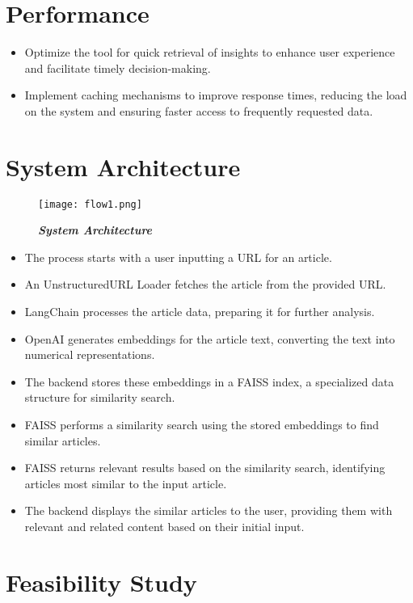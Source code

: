 \documentclass[12pt,a4paper]{report}
\begin{document}
{\section{Performance}
\begin{itemize}
	\item Optimize the tool for quick retrieval of insights to enhance user experience and facilitate timely decision-making.
	\item Implement caching mechanisms to improve response times, reducing the load on the system and ensuring faster access to frequently requested data.
	
\end{itemize}
\section{System Architecture}
\begin{figure}[ht]
	\begin{center}
		\texttt{[image: flow1.png]}
	\end{center}
	\caption{\textit{\textbf{System Architecture}}}
\end{figure}
\begin{itemize}
    \item The process starts with a user inputting a URL for an article.
    \item An UnstructuredURL Loader fetches the article from the provided URL.
    \item LangChain processes the article data, preparing it for further analysis.
    \item OpenAI generates embeddings for the article text, converting the text into numerical representations.
    \item The backend stores these embeddings in a FAISS index, a specialized data structure for similarity search.
    \item FAISS performs a similarity search using the stored embeddings to find similar articles.
    \item FAISS returns relevant results based on the similarity search, identifying articles most similar to the input article.
    \item The backend displays the similar articles to the user, providing them with relevant and related content based on their initial input.
\end{itemize}
\section{Feasibility Study}
}
\end{document}
